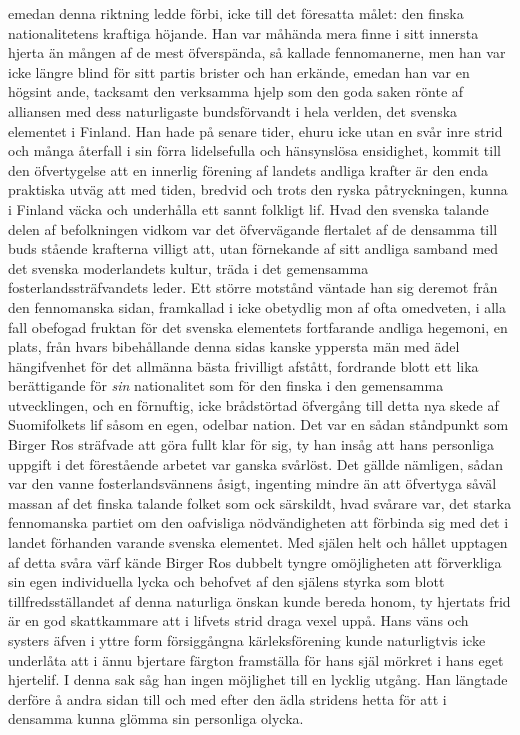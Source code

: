 emedan denna riktning ledde förbi, icke till det föresatta målet: den
finska nationalitetens kraftiga höjande. Han var måhända mera finne i
sitt innersta hjerta än mången af de mest öfverspända, så kallade
fennomanerne, men han var icke längre blind för sitt partis brister och
han erkände, emedan han var en högsint ande, tacksamt den verksamma
hjelp som den goda saken rönte af alliansen med dess naturligaste
bundsförvandt i hela verlden, det svenska elementet i Finland. Han hade
på senare tider, ehuru icke utan en svår inre strid och många återfall i
sin förra lidelsefulla och hänsynslösa ensidighet, kommit till den
öfvertygelse att en innerlig förening af landets andliga krafter är den
enda praktiska utväg att med tiden, bredvid och trots den ryska
påtryckningen, kunna i Finland väcka och underhålla ett sannt folkligt
lif. Hvad den svenska talande delen af befolkningen vidkom var det
öfvervägande flertalet af de densamma till buds stående krafterna
villigt att, utan förnekande af sitt andliga samband med det svenska
moderlandets kultur, träda i det gemensamma fosterlandssträfvandets
leder. Ett större motstånd väntade han sig deremot från den fennomanska
sidan, framkallad i icke obetydlig mon af ofta omedveten, i alla fall
obefogad fruktan för det svenska elementets fortfarande andliga
hegemoni, en plats, från hvars bibehållande denna sidas kanske yppersta
män med ädel hängifvenhet för det allmänna bästa frivilligt afstått,
fordrande blott ett lika berättigande för \emph{sin} nationalitet som
för den finska i den gemensamma utvecklingen, och en förnuftig, icke
brådstörtad öfvergång till detta nya skede af Suomifolkets lif såsom en
egen, odelbar nation. Det var en sådan ståndpunkt som Birger Ros
sträfvade att göra fullt klar för sig, ty han insåg att hans personliga
uppgift i det förestående arbetet var ganska svårlöst. Det gällde
nämligen, sådan var den vanne fosterlandsvännens åsigt, ingenting mindre
än att öfvertyga såväl massan af det finska talande folket som ock
särskildt, hvad svårare var, det starka fennomanska partiet om den
oafvisliga nödvändigheten att förbinda sig med det i landet förhanden
varande svenska elementet. Med själen helt och hållet upptagen af detta
svåra värf kände Birger Ros dubbelt tyngre omöjligheten att förverkliga
sin egen individuella lycka och behofvet af den själens styrka som blott
tillfredsställandet af denna naturliga önskan kunde bereda honom, ty
hjertats frid är en god skattkammare att i lifvets strid draga vexel
uppå. Hans väns och systers äfven i yttre form försiggångna
kärleksförening kunde naturligtvis icke underlåta att i ännu bjertare
färgton framställa för hans själ mörkret i hans eget hjertelif. I denna
sak såg han ingen möjlighet till en lycklig utgång. Han längtade derföre
å andra sidan till och med efter den ädla stridens hetta för att i
densamma kunna glömma sin personliga olycka.

